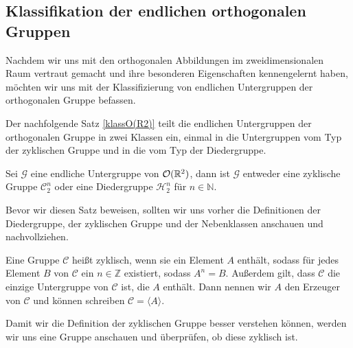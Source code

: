 \subsection{Klassifikation der endlichen orthogonalen Gruppen}
Nachdem wir uns mit den orthogonalen Abbildungen im zweidimensionalen Raum vertraut gemacht und ihre besonderen Eigenschaften kennengelernt haben, möchten wir uns mit der Klassifizierung von endlichen Untergruppen der orthogonalen Gruppe befassen.

Der nachfolgende Satz \ref{klassO(R2)} teilt die endlichen Untergruppen der orthogonalen Gruppe in zwei Klassen ein, einmal in die Untergruppen vom Typ der zyklischen Gruppe und in die vom Typ der Diedergruppe.
\newpage
\begin{theorem}\label{klassO(R2)}
	Sei $\mathcal{G}$ eine endliche Untergruppe von ${\mathcal{O}(\mathbb{R}^2)}$, dann ist $\mathcal{G}$ entweder eine zyklische Gruppe $\mathcal{C}^n_2$ oder eine Diedergruppe $\mathcal{H}^n_2$ für $n \in \mathbb{N}$.
\end{theorem}
Bevor wir diesen Satz beweisen, sollten wir uns vorher die Definitionen der Diedergruppe, der zyklischen Gruppe und der Nebenklassen anschauen und nachvollziehen.
\begin{defi}
	Eine Gruppe $\mathcal{C}$ heißt zyklisch, wenn sie ein Element $A$ enthält, sodass für jedes Element $B$ von $\mathcal{C}$ ein $n \in \mathbb{Z}$ existiert, sodass $A^n = B$. Außerdem gilt, dass $\mathcal{C}$ die einzige Untergruppe von $\mathcal{C}$ ist, die $A$ enthält. Dann nennen wir $A$ den Erzeuger von $\mathcal{C}$ und können schreiben $\mathcal{C} = \langle A \rangle$.
\end{defi}
Damit wir die Definition der zyklischen Gruppe besser verstehen können, werden wir uns eine Gruppe anschauen und überprüfen, ob diese zyklisch ist.

